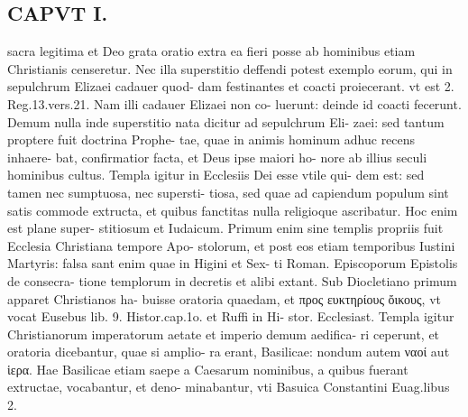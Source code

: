 \documentclass{article}
\begin{document}
\begin{pages}
\section*{CAPVT  I. }
\marginpar{[ p.71 ]}\pstart sacra legitima et Deo grata oratio extra ea fieri posse ab hominibus etiam Christianis censeretur. Nec illa superstitio deffendi potest exemplo eorum, qui in sepulchrum Elizaei cadauer quod- dam festinantes et coacti proiecerant. vt est 2. Reg.13.vers.21. Nam illi cadauer Elizaei non co- luerunt: deinde id coacti fecerunt. Demum nulla inde superstitio nata dicitur ad sepulchrum Eli- zaei: sed tantum proptere fuit doctrina Prophe- tae, quae in animis hominum adhuc recens inhaere- bat, confirmatior facta, et Deus ipse maiori ho- nore ab illius seculi hominibus cultus. Templa igitur in Ecclesiis Dei esse vtile qui- dem est: sed tamen nec sumptuosa, nec supersti- tiosa, sed quae ad capiendum populum sint satis commode extructa, et quibus fanctitas nulla religioque ascribatur. Hoc enim est plane super- stitiosum et Iudaicum. Primum enim sine templis propriis fuit Ecclesia Christiana tempore Apo- stolorum, et post eos etiam temporibus Iustini Martyris: falsa sant enim quae in Higini et Sex- ti Roman. Episcoporum Epistolis de consecra- tione templorum in decretis et alibi extant. Sub Diocletiano primum apparet Christianos ha- buisse oratoria quaedam, et προς ευκτηρίους  ὄικους, vt vocat Eusebus  lib. 9. Histor.cap.1o. et Ruffi in Hi- stor. Ecclesiast. Templa igitur Christianorum imperatorum aetate et imperio demum aedifica- ri ceperunt, et oratoria dicebantur, quae si amplio- ra erant, Basilicae: nondum autem ναοί aut ἱερα. Hae Basilicae etiam saepe a Caesarum nominibus, a quibus fuerant extructae, vocabantur, et deno- minabantur, vti Basuica Constantini Euag.libus 2.  \pend

\end{pages}
\end{document}
